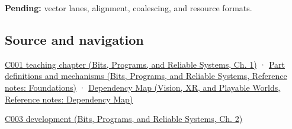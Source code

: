 \textbf{Pending:} vector lanes, alignment, coalescing, and resource formats.

\subsection{Source and navigation}\label{appendix-3c7b1a56de01-source-and-navigation}

\hypertarget{appendix-3c7b1a56de01-source-and-navigation}{}

\href{../01-Bits-Programs-and-Reliable-Systems/main.pdf\#nameddest=01-foundations-i-ch001-from-a-signal-to-an-interpretation}{C001 teaching chapter (Bits, Programs, and Reliable Systems, Ch. 1)} · \href{../01-Bits-Programs-and-Reliable-Systems/main.pdf\#nameddest=appendix-fd090d982a15}{Part definitions and mechanisms (Bits, Programs, and Reliable Systems, Reference notes: Foundations)} · \href{../07-Vision-XR-and-Playable-Worlds/main.pdf\#nameddest=appendix-4ad47bdd269a}{Dependency Map (Vision, XR, and Playable Worlds, Reference notes: Dependency Map)}

\href{../01-Bits-Programs-and-Reliable-Systems/main.pdf\#nameddest=01-foundations-i-ch002-where-the-bytes-live}{C003 development (Bits, Programs, and Reliable Systems, Ch. 2)}
